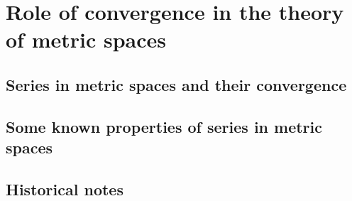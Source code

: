 \chapter{Role of convergence in the theory of metric spaces}

\section{Series in metric spaces and their convergence}

\section{Some known properties of series in metric spaces}

\section{Historical notes}

